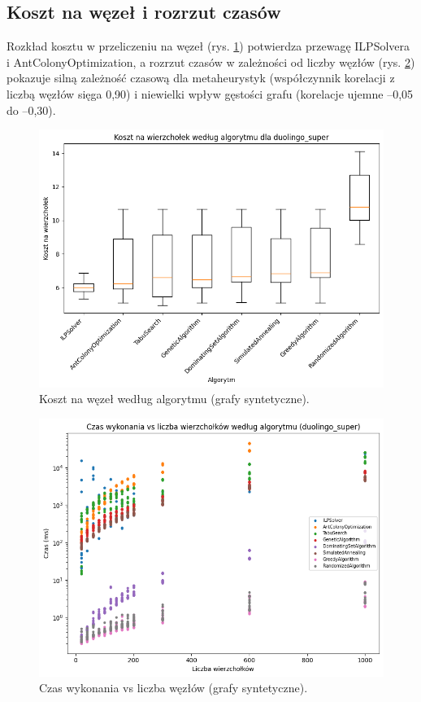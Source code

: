 \subsection{Koszt na węzeł i rozrzut czasów}

Rozkład kosztu w przeliczeniu na węzeł (rys. \ref{fig:synthetic_cost_per_node}) potwierdza przewagę ILPSolvera i AntColonyOptimization, a rozrzut czasów w zależności od liczby węzłów (rys. \ref{fig:synthetic_time_scatter}) pokazuje silną zależność czasową dla metaheurystyk (współczynnik korelacji z liczbą węzłów sięga 0,90) i niewielki wpływ gęstości grafu (korelacje ujemne --0,05 do --0,30).

\begin{figure}[H]
  \centering
  \includegraphics[width=0.7\linewidth]{assets/figures/synthetic_cost_per_node.png}
  \caption{Koszt na węzeł według algorytmu (grafy syntetyczne).}
  \label{fig:synthetic_cost_per_node}
\end{figure}

\begin{figure}[H]
  \centering
  \includegraphics[width=0.7\linewidth]{assets/figures/synthetic_time_scatter.png}
  \caption{Czas wykonania vs liczba węzłów (grafy syntetyczne).}
  \label{fig:synthetic_time_scatter}
\end{figure}


